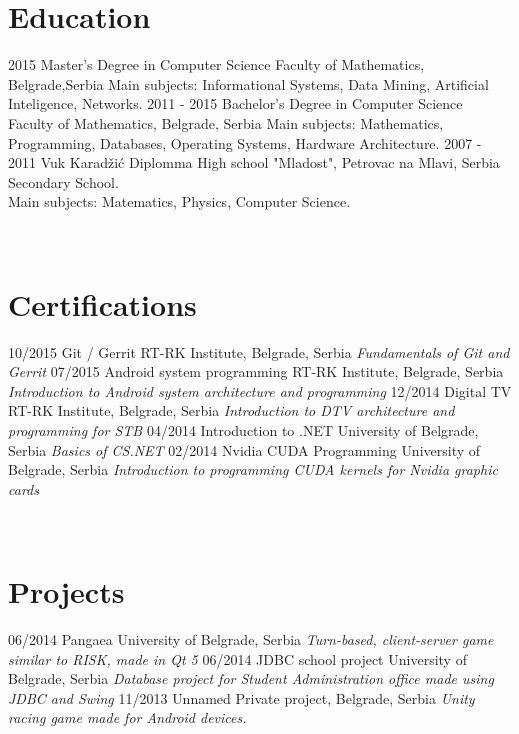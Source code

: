\documentclass[]{rankovic-cv}
\begin{document}
\section{Education}
\begin{entrylist}
  \entry
    {2015}
    {Master's Degree in Computer Science}
    {Faculty of Mathematics, Belgrade,Serbia}
    {Main subjects: Informational Systems, Data Mining, Artificial Inteligence, Networks.}
  \entry
    {2011 - 2015}
    {Bachelor's Degree in Computer Science}
    {Faculty of Mathematics, Belgrade, Serbia}
    {Main subjects: Mathematics, Programming, Databases, Operating Systems, Hardware Architecture.}
  \entry
    {2007 - 2011}
    {Vuk Karadžić Diplomma}
    {High school "Mladost", Petrovac na Mlavi, Serbia}
    {Secondary School.\\
    Main subjects: Matematics, Physics, Computer Science.}
\end{entrylist}
~
\section{Certifications}
\begin{entrylist}
  \entry
    {10/2015}
    {Git / Gerrit}
    {RT-RK Institute, Belgrade, Serbia}
    {\emph{Fundamentals of Git and Gerrit}}
  \entry
    {07/2015}
    {Android system programming}
    {RT-RK Institute, Belgrade, Serbia}
    {\emph{Introduction to Android system architecture and programming}}
  \entry
    {12/2014}
    {Digital TV}
    {RT-RK Institute, Belgrade, Serbia}
    {\emph{Introduction to DTV architecture and programming for STB}}
  \entry
    {04/2014}
    {Introduction to .NET }
    {University of Belgrade, Serbia}
    {\emph{Basics of CS.NET}}
  \entry
    {02/2014}
    {Nvidia CUDA Programming}
    {University of Belgrade, Serbia}
    {\emph{Introduction to programming CUDA kernels for Nvidia graphic cards}}
\end{entrylist}
~
\section{Projects}
\begin{entrylist}
  \entry
    {06/2014}
    {Pangaea}
    {University of Belgrade, Serbia}
    {\emph{Turn-based, client-server game similar to RISK, made in Qt 5}}
  \entry
    {06/2014}
    {JDBC school project}
    {University of Belgrade, Serbia}
    {\emph{Database project for Student Administration office made using JDBC and Swing}}
  \entry
    {11/2013}
    {Unnamed}
    {Private project, Belgrade, Serbia}
    {\emph{Unity racing game made for Android devices.}}  
\end{entrylist}
~
\end{document}

